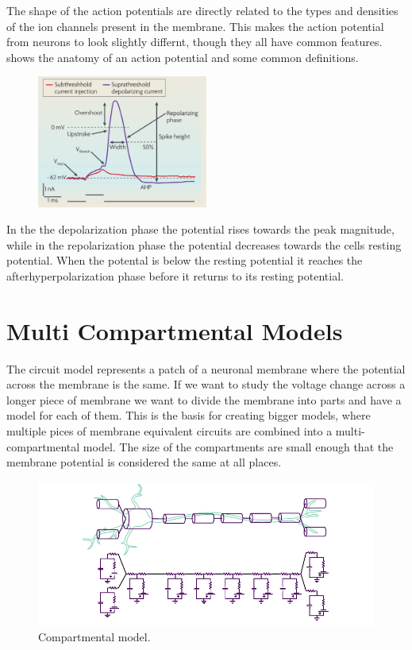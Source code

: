 \documentclass[altfont, fleqn]{uiophd}
\renewcommand{\Cref}[1]{{\color{viridis_03}\myCref{#1}}}
\begin{document}
The shape of the action potentials are directly 
related to the types and densities
of the ion channels present in the membrane. 
This makes the action potential from neurons to look slightly differnt, 
though they all have common features. 
\Cref{fig:2_action_potential_anatomy} shows the anatomy of an action potential and some common definitions. 
\begin{figure}[h]
    \centering
    \includegraphics[width=0.5\textwidth]{images/sec_2/action_potential_anatomy.pdf}
    \caption{
    }
    \label{fig:2_action_potential_anatomy}
\end{figure}

In the the depolarization phase the potential rises towards the peak magnitude, 
while in the repolarization phase the potential decreases towards
the cells resting potential.
When the potental is below the resting potential 
it reaches the afterhyperpolarization phase before
it returns to its resting potential.

\section{Multi Compartmental Models}
The circuit model represents a patch of a neuronal membrane
where the potential across the membrane is the same. 
If we want to study the voltage change across a longer piece of 
membrane we want to divide the membrane into parts and have a model for
each of them. 
This is the basis for creating bigger models, where multiple pices
of membrane equivalent circuits are combined into a multi-compartmental
model. 
The size of the compartments are small enough that the membrane potential is
considered the same at all places. 

\begin{figure}[h]
    \centering
    \includegraphics[width=1.0\textwidth]{images/2_1/compartments.pdf}
    \caption{Compartmental model.}
    \label{fig:2_comp_mod}
\end{figure}
\end{document}
